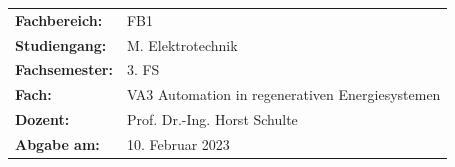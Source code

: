 \documentclass[
	pagesize,
	fontsize=12pt,
	paper=a4,
	oneside,
    reqno
]{scrartcl}
\numberwithin{equation}{section} %
\numberwithin{table}{section} %
\numberwithin{figure}{section} %
\begin{document}
\begin{titlepage}
   \vspace{1cm}

   \begin{tabular}{l l}
      \textbf{Fachbereich:}   & FB1                                                 \\
      \textbf{Studiengang:}   & M.\xspace Elektrotechnik                            \\
      \textbf{Fachsemester:}  & 3.\xspace FS                                        \\
      \textbf{Fach:}          & VA3 Automation in regenerativen Energiesystemen     \\
      \textbf{Dozent:}        & Prof.\xspace Dr.\xspace -Ing.\xspace Horst Schulte  \\
      \textbf{Abgabe am:}     & 10.\xspace Februar 2023                             \\ 
   \end{tabular}
\end{titlepage}
\clearpage

\renewcommand{\contentsname}{Inhaltsverzeichnis}
\tableofcontents
\clearpage

\renewcommand{\listfigurename}{Abbildungsverzeichnis}
\renewcommand*{\figurename}{Abb.}
\listoffigures

\renewcommand*{\listtablename}{Tabellenverzeichnis}
\renewcommand*{\tablename}{Tab.}
\listoftables

\end{document}
